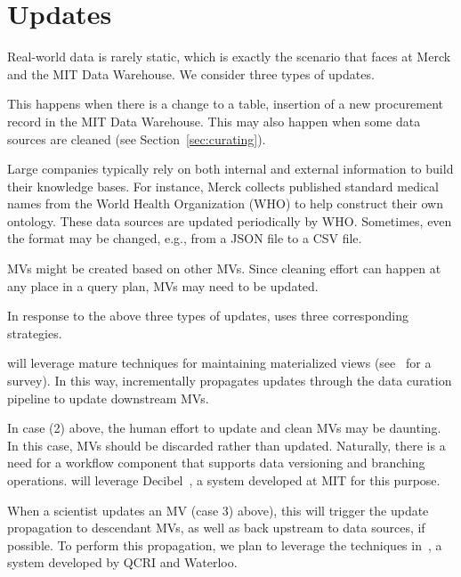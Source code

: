 \section{Updates}
\label{sec:updates}

Real-world data is rarely static, which is exactly the scenario that \dcv faces at Merck and the MIT Data Warehouse.  We consider three types of updates.

 This happens when there is a change to a table, \eg insertion of a new procurement record in the MIT Data Warehouse. This may also happen when some data sources are cleaned (see Section~\ref{sec:curating}).


 Large companies typically rely on both internal and external information to build their knowledge bases. For instance, Merck collects published standard medical names from the World Health Organization (WHO) to help construct their own ontology. These data sources are updated periodically by WHO.  Sometimes, even the format may be changed, e.g., from a JSON file to a CSV file.


 MVs might be created based on other MVs.  Since cleaning effort can happen at any place in a query plan, MVs may need to be updated.


In response to the above three types of updates, \dcv uses three corresponding strategies.


 \dcv will leverage mature techniques for maintaining materialized views (see~\cite{DBLP:journals/debu/GuptaM95} for a survey).  In this way, \dcv incrementally propagates updates through the data curation pipeline to update downstream MVs.




  In case (2) above, the human effort to update and clean MVs may be daunting. In this case, MVs should be discarded rather than updated. Naturally, there is a need for a workflow component that supports data versioning and branching operations. \dcv will leverage Decibel~\cite{DBLP:journals/pvldb/MaddoxGEMPD16}, a system developed at MIT for this purpose.

 When a scientist updates an MV (case 3) above), this will trigger the update propagation to descendant MVs, as well as back upstream to data sources, if possible. To perform this propagation, we plan to leverage the techniques in~\cite{DBLP:conf/sigmod/ChalamallaIOP14}, a system developed by QCRI and Waterloo.



